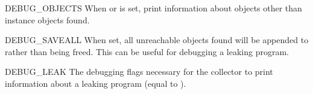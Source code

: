 \begin{datadesc}{DEBUG_OBJECTS}
When  or  is
set, print information about objects other than instance objects found.
\end{datadesc}

\begin{datadesc}{DEBUG_SAVEALL}
When set, all unreachable objects found will be appended to
 rather than being freed.  This can be useful for debugging
a leaking program.
\end{datadesc}

\begin{datadesc}{DEBUG_LEAK}
The debugging flags necessary for the collector to print
information about a leaking program (equal to ).
\end{datadesc}
